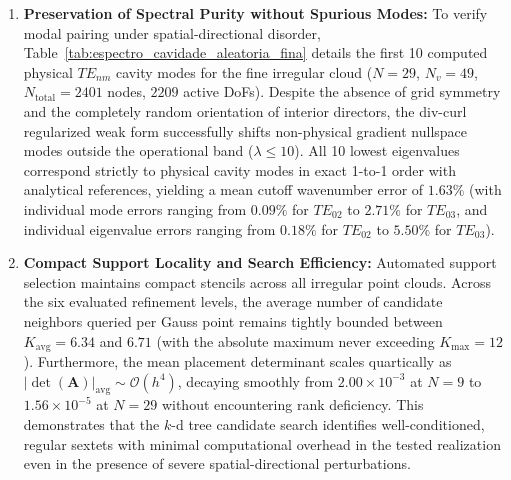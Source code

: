 \documentclass[preprint,12pt]{elsarticle}
\begin{document}
\begin{enumerate}
    \item \textbf{Preservation of Spectral Purity without Spurious Modes:} To verify modal pairing under spatial-directional disorder, Table~\ref{tab:espectro_cavidade_aleatoria_fina} details the first 10 computed physical $TE_{nm}$ cavity modes for the fine irregular cloud ($N = 29$, $N_v = 49$, $N_{\mathrm{total}} = 2401$ nodes, $2209$ active DoFs). Despite the absence of grid symmetry and the completely random orientation of interior directors, the div-curl regularized weak form successfully shifts non-physical gradient nullspace modes outside the operational band ($\lambda \le 10$). All 10 lowest eigenvalues correspond strictly to physical cavity modes in exact 1-to-1 order with analytical references, yielding a mean cutoff wavenumber error of $1.63\%$ (with individual mode errors ranging from $0.09\%$ for $TE_{02}$ to $2.71\%$ for $TE_{03}$, and individual eigenvalue errors ranging from $0.18\%$ for $TE_{02}$ to $5.50\%$ for $TE_{03}$).
    
    \item \textbf{Compact Support Locality and Search Efficiency:} Automated support selection maintains compact stencils across all irregular point clouds. Across the six evaluated refinement levels, the average number of candidate neighbors queried per Gauss point remains tightly bounded between $K_{\mathrm{avg}} = 6.34$ and $6.71$ (with the absolute maximum never exceeding $K_{\mathrm{max}} = 12$). Furthermore, the mean placement determinant scales quartically as $|\det(\mathbf{A})|_{\mathrm{avg}} \sim \mathcal{O}(h^4)$, decaying smoothly from $2.00 \times 10^{-3}$ at $N=9$ to $1.56 \times 10^{-5}$ at $N=29$ without encountering rank deficiency. This demonstrates that the $k$-d tree candidate search identifies well-conditioned, regular sextets with minimal computational overhead in the tested realization even in the presence of severe spatial-directional perturbations.
\end{enumerate}
\end{document}
